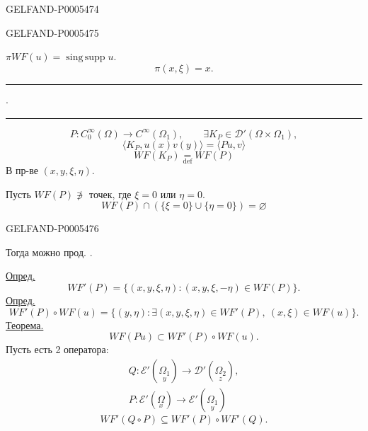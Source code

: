 \begin{GelfandAdjacentEvidence}{GELFAND-P000547}{4}

\end{GelfandAdjacentEvidence}
\begin{GelfandAdjacentEvidence}{GELFAND-P000547}{5}


\qquad
\(\pi WF(u)=\operatorname{sing\,supp}u\).
\[
\pi(x,\xi)=x.
\]
\hfill\rule{1.2cm}{.35pt}\enspace\(\cdot\)\enspace\rule{1.4cm}{.35pt}\par

\[
P:C_0^\infty(\Omega)\longrightarrow C^\infty(\Omega_1),\qquad
\exists K_P\in\mathcal D'(\Omega\times\Omega_1),
\]
\[
\langle K_P,u(x)v(y)\rangle=\langle Pu,v\rangle
\]
\[
WF(K_P)\underset{\mathrm{def}}{=}WF(P)
\]
В пр-ве \((x,y,\xi,\eta)\).

Пусть \(WF(P)\not\ni\) точек, где \(\xi=0\) или \(\eta=0\).
\[
\boxed{WF(P)\cap(\{\xi=0\}\cup\{\eta=0\})=\varnothing}
\]
\end{GelfandAdjacentEvidence}
\begin{GelfandAdjacentEvidence}{GELFAND-P000547}{6}

Тогда можно прод. .

\uline{Опред.}
\[
WF'(P)=\{(x,y,\xi,\eta):(x,y,\xi,-\eta)\in WF(P)\}.
\]
\uline{Опред.}
\[
WF'(P)\circ WF(u)=
\{(y,\eta):\exists(x,y,\xi,\eta)\in WF'(P),\ (x,\xi)\in WF(u)\}.
\]
\uline{Теорема.}
\[
WF(Pu)\subset WF'(P)\circ WF(u).
\]
Пусть есть 2 оператора:
\begin{gather*}
Q:\mathcal E'(\underset{y}{\Omega_1})\longrightarrow
\mathcal D'(\underset{z}{\Omega_2}),\\
P:\mathcal E'(\underset{x}{\Omega})\longrightarrow
\mathcal E'(\underset{y}{\Omega_1})
\end{gather*}
\[
WF'(Q\circ P)\subseteq WF'(P)\circ WF'(Q).
\]
\end{GelfandAdjacentEvidence}

